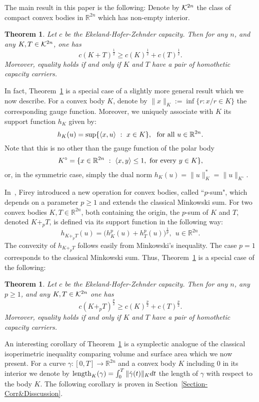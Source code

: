 \documentclass[12pt]{article}
\newtheorem{theorem}[lemma]{Theorem}
\begin{document}
The main result in this paper is the following: Denote by ${\cal
K}^{2n}$ the class of compact convex bodies in ${\mathbb R}^{2n}$
which has non-empty interior.


\begin{theorem}\label{MT}
Let $c$ be the Ekeland-Hofer-Zehnder capacity.
 Then for any $n$, and any
 $K,T \in {\cal K}^{2n}$, one has
\begin{equation} \label{BM-ineq-for-p=1}
c(K+ T)^{\frac 1 2} \geq  c(K)^{\frac 1 2}+ c(T)^{\frac 1 2}.
\end{equation}
Moreover, equality holds if and only if $K$ and $T$ have a pair of homothetic capacity carriers.
\end{theorem}
In fact, Theorem~\ref{MT} is a special case of a slightly more general result
which we now  describe.
For a convex body $K$, denote by $\|x\|_K := \inf\{r: x/r \in K\}$ the
corresponding gauge function. Moreover, we uniquely associate with $K$ its support function
$h_K$ given by:
$$ h_K(u) = \sup \{ \langle x, u \rangle \ : \  x \in K \}, \ \ {\rm
for \ all} \ u \in {\mathbb R}^{2n}.$$ Note that this is no other
than the gauge function of the polar body
\[K^{\circ} = \{ x \in {\mathbb R}^{2n} \ : \ \langle x , y \rangle
\leq 1, \ {\rm for} \ {\rm every} \ y \in K \},\]
or, in the
symmetric case, simply the dual norm $h_K(u) = \| u\|_K^* = \| u
\|_{K^{\circ}}$.

In~\cite{F}, Firey introduced a new operation for convex bodies,
called ``$p$-sum", which depends on a parameter $p \geq 1$ and
extends the classical Minkowski sum. For two convex bodies $K,T
\in {\mathbb R}^{2n}$, both containing the origin, the $p$-sum of
$K$ and $T$, denoted $K+_pT$, is defined via its support function
in the following way:
\begin{equation} \label{p-sum} h_{K+_pT}(u)
= \bigl ( h^p_K(u) + h^p_T(u) \bigr )^{\frac  1 p}, \ \  u \in
{\mathbb R}^{2n}. \end{equation} The convexity of $h_{K+_p T}$
follows easily from Minkowski's inequality. The  case $p = 1$
corresponds to the classical Minkowski sum. Thus, Theorem~\ref{MT}
is a special case of the following:


\begin{theorem}\label{MT_for_p}
Let $c$ be the Ekeland-Hofer-Zehnder capacity.
 Then for any $n$, any $p \geq 1$, and any
 $K,T \in {\cal K}^{2n}$ one has
\begin{equation} \label{BM-ineq-gen}
c(K+_p T)^{\frac p 2} \geq  c(K)^{\frac p 2}+ c(T)^{\frac p 2}.
\end{equation}
Moreover, equality holds if and only if $K$ and $T$ have a pair of homothetic capacity carriers.
\end{theorem}
An interesting corollary of Theorem~\ref{MT} is a symplectic
analogue of the classical isoperimetric inequality comparing volume
and surface area which we now present. For a curve $ \gamma :[0,T]
\rightarrow {\mathbb R}^{2n}$ and a convex body $K$ including $0$ in
its interior we denote by ${\rm length}_{K} (\gamma) = \int_0^T \|
\dot \gamma(t) \|_K dt$ the length of $\gamma$ with respect to the
body $K$. The following corollary is proven in
Section~\ref{Section-Corr&Disscussion}.
\end{document}
